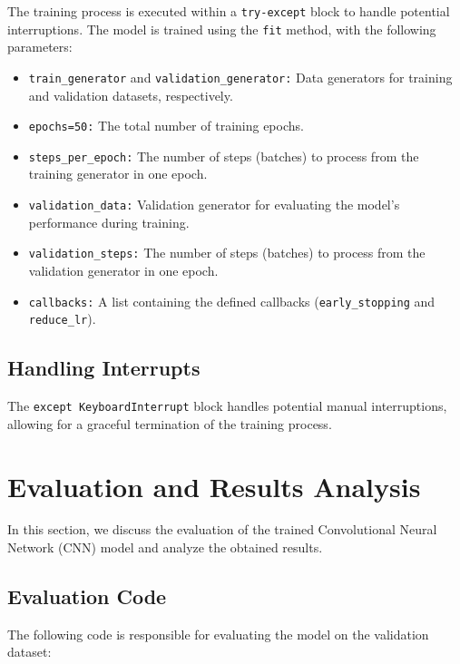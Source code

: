 \documentclass{article}
\begin{document}
The training process is executed within a \texttt{try-except} block to handle potential interruptions. The model is trained using the \texttt{fit} method, with the following parameters:

\begin{itemize}
    \item \texttt{train\_generator} and \texttt{validation\_generator:} Data generators for training and validation datasets, respectively.

    \item \texttt{epochs=50:} The total number of training epochs.

    \item \texttt{steps\_per\_epoch:} The number of steps (batches) to process from the training generator in one epoch.

    \item \texttt{validation\_data:} Validation generator for evaluating the model's performance during training.

    \item \texttt{validation\_steps:} The number of steps (batches) to process from the validation generator in one epoch.

    \item \texttt{callbacks:} A list containing the defined callbacks (\texttt{early\_stopping} and \texttt{reduce\_lr}).
\end{itemize}

\subsection{Handling Interrupts}

The \texttt{except KeyboardInterrupt} block handles potential manual interruptions, allowing for a graceful termination of the training process.

\section{Evaluation and Results Analysis}

In this section, we discuss the evaluation of the trained Convolutional Neural Network (CNN) model and analyze the obtained results.

\subsection{Evaluation Code}

The following code is responsible for evaluating the model on the validation dataset:
\end{document}

